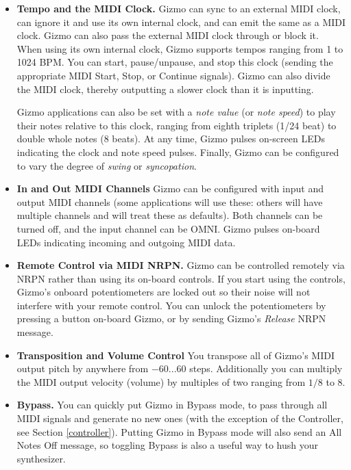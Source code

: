 \documentclass{article}
\begin{document}
\begin{itemize}
\item {\bf Tempo and the MIDI Clock.}  Gizmo can sync to an external MIDI clock, can ignore it and use its own internal clock, and can emit the same as a MIDI clock.  Gizmo can also pass the external MIDI clock through or block it.  When using its own internal clock, Gizmo supports tempos ranging from 1 to 1024 BPM.  You can start, pause/unpause, and stop this clock (sending the appropriate MIDI Start, Stop, or Continue signals).  Gizmo can also divide the MIDI clock, thereby outputting a slower clock than it is inputting.

Gizmo applications can also be set with a {\it note value} (or {\it note speed}) to play their notes relative to this clock, ranging from eighth triplets (1/24 beat) to double whole notes (8 beats).  At any time, Gizmo pulses on-screen LEDs indicating the clock and note speed pulses.  Finally, Gizmo can be configured to vary the degree of {\it swing} or {\it syncopation}.

\item {\bf In and Out MIDI Channels}  Gizmo can be configured with input and output MIDI channels (some applications will use these: others will have multiple channels and will treat these as defaults).  Both channels can be turned off, and the input channel can be OMNI.  Gizmo pulses on-board LEDs indicating incoming and outgoing MIDI data.  

\item {\bf Remote Control via MIDI NRPN.} Gizmo can be controlled remotely via NRPN rather than using its on-board controls.  If you start using the controls, Gizmo's onboard potentiometers are locked out so their noise will not interfere with your remote control.  You can unlock the potentiometers by pressing a button on-board Gizmo, or by sending Gizmo's {\it Release} NRPN message.

\item {\bf Transposition and Volume Control}  You transpose all of Gizmo's MIDI output pitch by anywhere from \(-60...60\) steps.  Additionally you can multiply the MIDI output velocity (volume) by multiples of two ranging from \(1/8\) to \(8\).

\item {\bf Bypass.}  You can quickly put Gizmo in Bypass mode, to pass through all MIDI signals and generate no new ones (with the exception of the Controller, see Section \ref{controller}).  Putting Gizmo in Bypass mode will also send an All Notes Off message, so toggling Bypass is also a useful way to hush your synthesizer.


\end{itemize}
\end{document}

